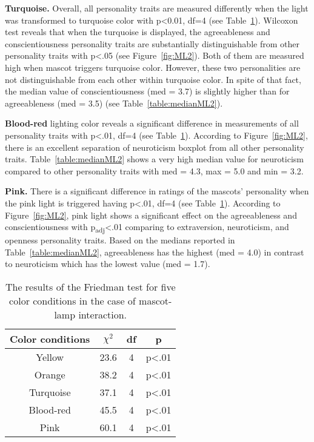 \par\textbf{Turquoise.}
Overall, all personality traits are measured differently when the light was transformed to turquoise color
with p<0.01, df=4 (see Table~\ref{table:friedmanML2}).
Wilcoxon test reveals that when the turquoise is displayed, the agreeableness and conscientiousness
personality traits are substantially distinguishable from other personality traits with p<.05 (see Figure~\ref{fig:ML2}).
Both of them are measured high when mascot triggers turquoise color.
However, these two personalities are not distinguishable from each other within turquoise color.
In spite of that fact, the median value of conscientiousness (med = 3.7) is slightly higher than
for agreeableness (med = 3.5) (see Table~\ref{table:medianML2}).

\par\textbf{Blood-red}
lighting color reveals a significant difference in measurements of all personality traits
with p<.01, df=4 (see Table~\ref{table:friedmanML2}).
According to Figure~\ref{fig:ML2}, there is an excellent separation of neuroticism boxplot from all other personality traits.
Table~\ref{table:medianML2} shows a very high median value for neuroticism compared to other
personality traits with med = 4.3, max = 5.0 and min = 3.2.

\par\textbf{Pink.}
There is a significant difference in ratings of the mascots' personality when the pink light is
triggered having p<.01, df=4 (see Table~\ref{table:friedmanML2}).
According to Figure~\ref{fig:ML2}, pink light shows a significant effect on the agreeableness
and conscientiousness with p\textsubscript{adj}<.01 comparing to extraversion, neuroticism, and openness personality traits.
Based on the medians reported in Table~\ref{table:medianML2}, agreeableness has the
highest (med = 4.0) in contrast to neuroticism which has the lowest value (med = 1.7).

\begin{table}[hbt!]
    \renewcommand{\arraystretch}{1}
    \begin{center}
        \begin{tabular}{|c|c|c|c|}
            \hline
            \textbf{Color conditions} & \textbf{$\chi^2$} & \textbf{df} & \textbf{p} \\
            \hline
            Yellow &23.6 &4 &p<.01 \\
            \hline
            Orange &38.2 &4 &p<.01\\
            \hline
            Turquoise &37.1 &4 &p<.01 \\
            \hline
            Blood-red &45.5 &4 &p<.01 \\
            \hline
            Pink &60.1 &4 &p<.01 \\
            \hline
        \end{tabular}
        \caption{The results of the Friedman test for five color conditions in the case of mascot-lamp interaction.}
        \label{table:friedmanML2}
    \end{center}
\end{table}

